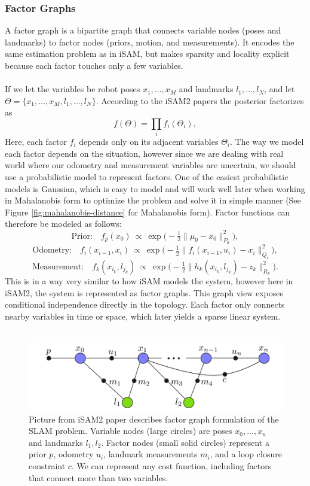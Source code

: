 \subsubsection{Factor Graphs}
A factor graph is a bipartite graph that connects variable nodes (poses and landmarks) to factor nodes (priors, motion, and measurements). It encodes the same estimation problem as in \gls{iSAM}, but makes sparsity and locality explicit because each factor touches only a few variables.
\\ \\
If we let the variables be robot poses $x_1,\dots,x_M$ and landmarks $l_1,\dots,l_N$, and let $\Theta=\{x_1,\dots,x_M,l_1,\dots,l_N\}$. According to the \gls{iSAM}2 papers \cite{iSAM2_paper,Bayes_tree_for_SLAM_paper} the posterior factorizes as
\[
    f(\Theta) = \prod_{i} f_i(\Theta_i),
\]
Here, each factor $f_i$ depends only on its adjacent variables $\Theta_i$. The way we model each factor depends on the situation, however since we are dealing with real world where our odometry and measurement variables are uncertain, we should use a probabilistic model to represent factors. One of the easiest probabilistic models is Gaussian, which is easy to model and will work well later when working in Mahalanobis form to optimize the problem and solve it in simple manner (See Figure \ref{fig:mahalanobis-distance} for Mahalanobis form). Factor functions can therefore be modeled as follows:
\[
    \text{Prior:}\quad f_p(x_0)\ \propto\ \exp\!\Big(-\tfrac{1}{2}\|\mu_0 - x_0\|_{P_0}^2\Big),
\]
\[
    \text{Odometry:}\quad f_i(x_{i-1},x_i)\ \propto\ \exp\!\Big(-\tfrac{1}{2}\|f_i(x_{i-1},u_i) - x_i\|_{Q_i}^2\Big),
\]
\[
    \text{Measurement:}\quad f_k(x_{i_k},l_{j_k})\ \propto\ \exp\!\Big(-\tfrac{1}{2}\|h_k(x_{i_k},l_{j_k}) - z_k\|_{R_k}^2\Big).
\]
This is in a way very similar to how \gls{iSAM} models the system, however here in \gls{iSAM}2, the system is represented as factor graphs. This graph view exposes conditional independence directly in the topology. Each factor only connects nearby variables in time or space, which later yields a sparse linear system.
\\ \\
\begin{figure}[H]
    \centering
    \includegraphics[width=0.98\linewidth]{Pictures/Optimizers/iSAM2/Factor_graph.png}
    \caption{Picture from \gls{iSAM}2 paper \cite{iSAM2_paper} describes factor graph formulation of the \gls{SLAM} problem. Variable nodes (large circles) are poses $x_0,\dots,x_n$ and landmarks $l_1,l_2$. Factor nodes (small solid circles) represent a prior $p$, odometry $u_i$, landmark measurements $m_i$, and a loop closure constraint $c$. We can represent any cost function, including factors that connect more than two variables.}
    \label{fig:optimizer-iSAM2-factor-graph}
\end{figure}
